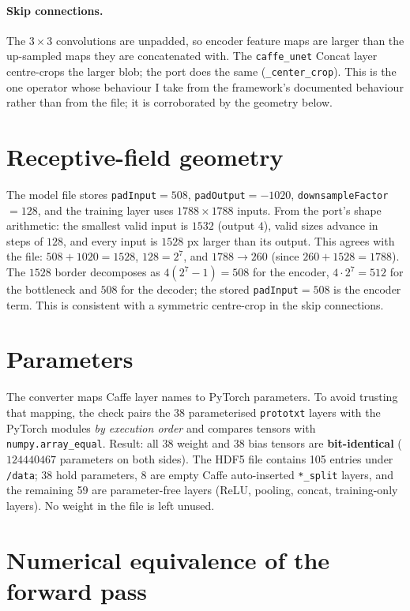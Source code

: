 \documentclass[11pt,a4paper]{article}
\begin{document}
\paragraph{Skip connections.} The $3{\times}3$ convolutions are unpadded, so encoder feature maps are larger than the up-sampled maps they are concatenated with. The \texttt{caffe\_unet} Concat layer centre-crops the larger blob; the port does the same (\texttt{\_center\_crop}). This is the one operator whose behaviour I take from the framework's documented behaviour rather than from the file; it is corroborated by the geometry below.

\section{Receptive-field geometry}
The model file stores \texttt{padInput}$=508$, \texttt{padOutput}$=-1020$, \texttt{downsampleFactor}$=128$, and the training layer uses $1788{\times}1788$ inputs. From the port's shape arithmetic: the smallest valid input is $1532$ (output $4$), valid sizes advance in steps of $128$, and every input is $1528$ px larger than its output. This agrees with the file: $508+1020=1528$, $128=2^7$, and $1788\to 260$ (since $260+1528=1788$). The $1528$ border decomposes as $4(2^7-1)=508$ for the encoder, $4\cdot2^7=512$ for the bottleneck and $508$ for the decoder; the stored \texttt{padInput}$=508$ is the encoder term. This is consistent with a symmetric centre-crop in the skip connections.

\section{Parameters}
The converter maps Caffe layer names to PyTorch parameters. To avoid trusting that mapping, the check pairs the 38 parameterised \texttt{prototxt} layers with the PyTorch modules \emph{by execution order} and compares tensors with \texttt{numpy.array\_equal}. Result: all 38 weight and 38 bias tensors are \textbf{bit-identical} ($\num[scientific-notation=false,round-mode=none]{124440467}$ parameters on both sides). The HDF5 file contains 105 entries under \texttt{/data}; 38 hold parameters, 8 are empty Caffe auto-inserted \texttt{*\_split} layers, and the remaining 59 are parameter-free layers (ReLU, pooling, concat, training-only layers). No weight in the file is left unused.

\section{Numerical equivalence of the forward pass}
\end{document}
